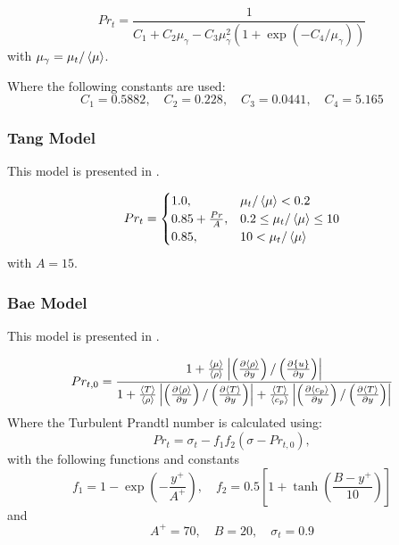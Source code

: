 \begin{equation}
Pr_{t} = \frac{1}{C_1+C_2\mu_\gamma-C_3\mu_\gamma^2(1+\exp(-C_4/\mu_\gamma))}
\end{equation}
with $\mu_\gamma = \mu_t/\left<{\mu}\right>$.

Where the following constants are used:
\begin{equation}
C_1=0.5882, \quad C_2=0.228, \quad C_3=0.0441, \quad C_4=5.165
\end{equation}




\subsubsection{Tang Model}

This model is presented in \cite{TANG20161082}.

\begin{equation}
  Pr_{t} =
    \begin{cases}
      1.0, & \mu_t/\left<{\mu}\right> < 0.2 \\
      0.85 + \frac{Pr}{A}, & 0.2 \leq \mu_t/\left<{\mu}\right> \leq 10\\
      0.85, & 10 < \mu_t/\left<{\mu}\right>
    \end{cases}       
\end{equation}
with $A=15$.





\subsubsection{Bae Model}
This model is presented in \cite{bae2016new}.

\begin{equation}
Pr_{t,0} = \frac{1+\frac{\left<{\mu}\right>}{\left<{\rho}\right>}\left|\left(\frac{\partial \left<{\rho}\right>}{\partial {y}}\right)/\left(\frac{\partial \{{u}\}}{\partial {y}}\right)\right|}{1+\frac{\left<{T}\right>}{\left<{\rho}\right>}\left|\left(\frac{\partial \left<{\rho}\right>}{\partial {y}}\right)/\left(\frac{\partial \left<{T}\right>}{\partial {y}}\right)\right|+\frac{\left<{T}\right>}{\left<{c_p}\right>}\left|\left(\frac{\partial \left<{c_p}\right>}{\partial {y}}\right)/\left(\frac{\partial \left<{T}\right>}{\partial {y}}\right)\right|}
\end{equation}
Where the Turbulent Prandtl number is calculated using:
\begin{equation} 
Pr_t = \sigma_t - f_1f_2(\sigma-Pr_{t,0}),
\end{equation}
with the following functions and constants
\begin{equation}
    f_1 = 1-\exp\left(-\frac{y^+}{A^+}\right), \quad f_2 = 0.5\left[1+\tanh\left(\frac{B-y^+}{10}\right)\right]
\end{equation}
and
\begin{equation}
A^+ =70, \quad B=20, \quad \sigma_t=0.9
\end{equation}


